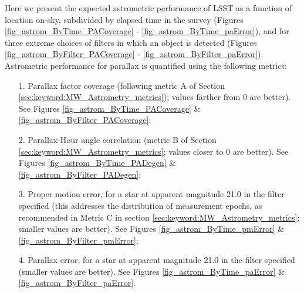 Here we present the expected astrometric performance of LSST as a function of
location on-sky, subdivided by elapsed time in the survey (Figures \ref{fig_astrom_ByTime_PACoverage} -  \ref{fig_astrom_ByTime_paError}), and for three extreme choices of filters in which an object is detected (Figures \ref{fig_astrom_ByFilter_PACoverage} -  \ref{fig_astrom_ByFilter_paError}). Astrometric performance for parallax is quantified using the following metrics:
\begin{itemize}
  \item[1.] Parallax factor coverage (following metric A of Section \ref{sec:keyword:MW_Astrometry_metrics}); values farther from 0 are better). See Figures \ref{fig_astrom_ByTime_PACoverage} \&  \ref{fig_astrom_ByFilter_PACoverage};
    \item[2.] Parallax-Hour angle correlation (metric B of Section \ref{sec:keyword:MW_Astrometry_metrics}; values closer to 0 are better). See Figures \ref{fig_astrom_ByTime_PADegen} \& \ref{fig_astrom_ByFilter_PADegen};
      \item[3.] Proper motion error, for a star at apparent magnitude 21.0 in the filter specified (this addresses the distribution of measurement epochs, as recommended in Metric C in section \ref{sec:keyword:MW_Astrometry_metrics}; smaller values are better). See Figures \ref{fig_astrom_ByTime_pmError} \& \ref{fig_astrom_ByFilter_pmError};
        \item[4.] Parallax error, for a star at apparent magnitude 21.0 in the filter specified (smaller values are better). See Figures \ref{fig_astrom_ByTime_paError} \& \ref{fig_astrom_ByFilter_paError}.
\end{itemize}

